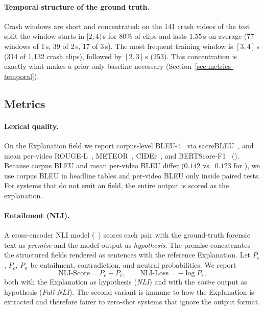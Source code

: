 \paragraph{Temporal structure of the ground truth.}
Crash windows are short and concentrated: on the 141 crash videos of the test split the window starts in $[2,4)$\,s for 80\% of clips and lasts $1.55$\,s on average (77 windows of 1\,s, 39 of 2\,s, 17 of 3\,s).
The most frequent training window is $[3,4]$\,s (314 of 1{,}132 crash clips), followed by $[2,3]$\,s (253).
This concentration is exactly what makes a prior-only baseline necessary (Section~\ref{sec:metrics-temporal}).

\subsection{Metrics}
\label{sec:metrics}

\paragraph{Lexical quality.}
On the Explanation field we report corpus-level BLEU-4~\cite{papineni2002bleu} via sacreBLEU~\cite{post2018sacrebleu}, and mean per-video ROUGE-L~\cite{lin2004rouge}, METEOR~\cite{banerjee2005meteor}, CIDEr~\cite{vedantam2015cider}, and BERTScore-F1~\cite{zhang2020bertscore} ().
Because corpus BLEU and mean per-video BLEU differ ($0.142$ vs.\ $0.123$ for \crashlogic), we use corpus BLEU in headline tables and per-video BLEU only inside paired tests.
For systems that do not emit an  field, the entire output is scored as the explanation.

\paragraph{Entailment (NLI).}
A cross-encoder NLI model (~\cite{he2023debertav3}) scores each pair with the ground-truth forensic text as \emph{premise} and the model output as \emph{hypothesis}.
The premise concatenates the structured fields rendered as sentences with the reference Explanation.
Let $P_e$, $P_c$, $P_n$ be entailment, contradiction, and neutral probabilities.
We report
\begin{equation}
\mathrm{NLI\text{-}Score}=P_e-P_c,\qquad \mathrm{NLI\text{-}Loss}=-\log P_e ,
\label{eq:nli}
\end{equation}
both with the Explanation as hypothesis (\emph{NLI}) and with the \emph{entire} output as hypothesis (\emph{Full-NLI}).
The second variant is immune to how the Explanation is extracted and therefore fairer to zero-shot systems that ignore the output format.


